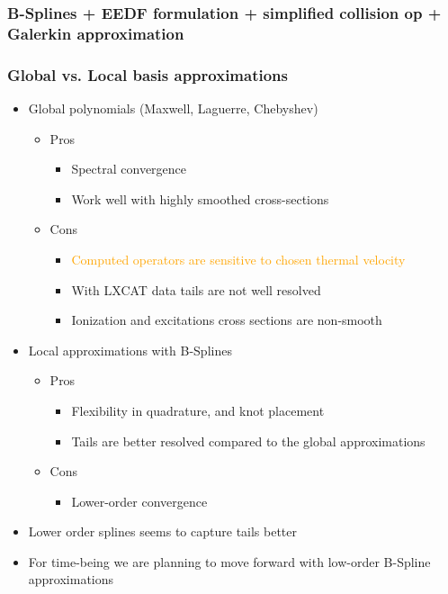 \documentclass[mathserif, aspectratio=169]{beamer}
\begin{document}
\begin{frame}
	\frametitle{B-Splines + EEDF formulation + simplified collision op + Galerkin approximation}
	\begin{figure}
	\end{figure}
\end{frame}

\begin{frame}
	\frametitle{Global vs. Local basis approximations}
	\begin{itemize}
		\item Global polynomials (Maxwell, Laguerre, Chebyshev)
		\begin{itemize}
			\item Pros
			\begin{itemize}
				\item Spectral convergence
				\item Work well with highly smoothed cross-sections
			\end{itemize}
			\item Cons
			\begin{itemize}
				\item \textcolor{orange}{Computed operators are sensitive to chosen thermal velocity}
				\item With LXCAT data tails are not well resolved 
				\item Ionization and excitations cross sections are non-smooth%
			\end{itemize}
		\end{itemize}
		\item Local approximations with B-Splines
		\begin{itemize}
			\item Pros
			\begin{itemize}
				\item Flexibility in quadrature, and knot placement
				\item Tails are better resolved compared to the global approximations
			\end{itemize}
			\item Cons
			\begin{itemize}
				\item Lower-order convergence
			\end{itemize}
		\end{itemize}
	\end{itemize}
	\begin{itemize}
		\item Lower order splines seems to capture tails better 
		\item For time-being we are planning to move forward with low-order B-Spline approximations 
	\end{itemize}
\end{frame}
\end{document}
